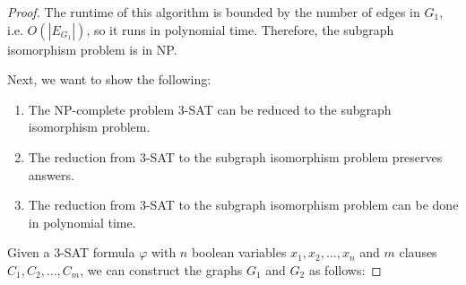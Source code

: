 \documentclass{article}
\begin{document}
\begin{proof}
    The runtime of this algorithm is bounded by the number of edges in $G_1$, i.e. $O(|E_{G_1}|)$, so it runs in polynomial time.
    Therefore, the subgraph isomorphism problem is in NP.

    Next, we want to show the following:
    \begin{enumerate}
        \item The NP-complete problem 3-SAT can be reduced to the subgraph isomorphism problem.
        \item The reduction from 3-SAT to the subgraph isomorphism problem preserves answers.
        \item The reduction from 3-SAT to the subgraph isomorphism problem can be done in polynomial time.
    \end{enumerate}

    Given a 3-SAT formula $\varphi$ with $n$ boolean variables $x_1, x_2, \ldots, x_n$ and $m$ clauses $C_1, C_2, \ldots, C_m$, we can construct the graphs $G_1$ and $G_2$ as follows:
\end{proof}
\end{document}
